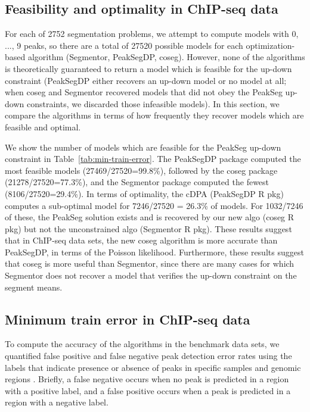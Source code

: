 \documentclass{article}
\begin{document}
\subsection{Feasibility and optimality in ChIP-seq data}

For each of 2752 segmentation problems, we attempt to compute models
with 0, ..., 9 peaks, so there are a total of 27520 possible models
for each optimization-based algorithm (Segmentor, PeakSegDP,
coseg). However, none of the algorithms is theoretically guaranteed to
return a model which is feasible for the up-down constraint (PeakSegDP
either recovers an up-down model or no model at all; when coseg and
Segmentor recovered models that did not obey the PeakSeg up-down
constraints, we discarded those infeasible models). In this section,
we compare the algorithms in terms of how frequently they recover
models which are feasible and optimal.

We show the number of models which are feasible for the PeakSeg
up-down constraint in Table~\ref{tab:min-train-error}. The PeakSegDP
package computed the most feasible models (27469/27520=99.8\%),
followed by the coseg package (21278/27520=77.3\%), and the Segmentor
package computed the fewest (8106/27520=29.4\%). In terms of
optimality, the cDPA (PeakSegDP R pkg) computes a sub-optimal model
for 7246/27520 = 26.3\% of models. For 1032/7246 of these, the PeakSeg
solution exists and is recovered by our new algo (coseg R pkg) but not
the unconstrained algo (Segmentor R pkg). These results suggest that
in ChIP-seq data sets, the new coseg algorithm is more accurate than
PeakSegDP, in terms of the Poisson likelihood. Furthermore, these
results suggest that coseg is more useful than Segmentor, since there
are many cases for which Segmentor does not recover a model that
verifies the up-down constraint on the segment means.

\subsection{Minimum train error in ChIP-seq data}

To compute the accuracy of the algorithms in the benchmark data sets,
we quantified false positive and false negative peak detection error
rates using the labels that indicate presence or absence of peaks in
specific samples and genomic regions
\citep{HOCKING2016-chipseq}. Briefly, a false negative occurs when no
peak is predicted in a region with a positive label, and a false
positive occurs when a peak is predicted in a region with a negative
label.
\end{document}
